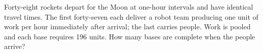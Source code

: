 Forty-eight rockets depart for the Moon at one-hour intervals and have identical travel times. The first forty-seven each deliver a robot team producing one unit of work per hour immediately after arrival; the last carries people. Work is pooled and each base requires 196 units. How many bases are complete when the people arrive?
